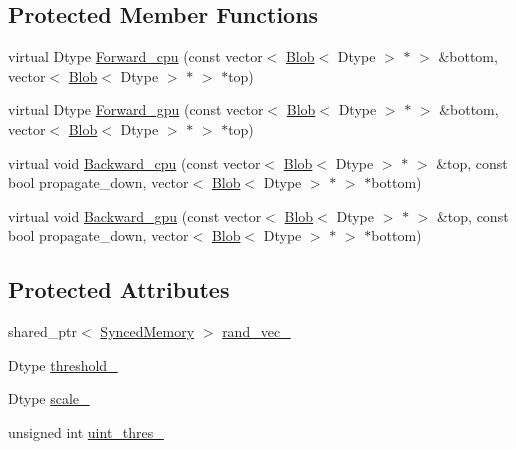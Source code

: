 \subsection*{Protected Member Functions}
\begin{DoxyCompactItemize}
\item 
virtual Dtype \hyperlink{classcaffe_1_1_dropout_layer_a031995973fec83788c03723d9855ec3f}{Forward\+\_\+cpu} (const vector$<$ \hyperlink{classcaffe_1_1_blob}{Blob}$<$ Dtype $>$ $\ast$ $>$ \&bottom, vector$<$ \hyperlink{classcaffe_1_1_blob}{Blob}$<$ Dtype $>$ $\ast$ $>$ $\ast$top)
\item 
virtual Dtype \hyperlink{classcaffe_1_1_dropout_layer_a7f568b33a08534687ee840a89e004a35}{Forward\+\_\+gpu} (const vector$<$ \hyperlink{classcaffe_1_1_blob}{Blob}$<$ Dtype $>$ $\ast$ $>$ \&bottom, vector$<$ \hyperlink{classcaffe_1_1_blob}{Blob}$<$ Dtype $>$ $\ast$ $>$ $\ast$top)
\item 
virtual void \hyperlink{classcaffe_1_1_dropout_layer_aca25a2d883356b1aa5a8c0fe852dc8a1}{Backward\+\_\+cpu} (const vector$<$ \hyperlink{classcaffe_1_1_blob}{Blob}$<$ Dtype $>$ $\ast$ $>$ \&top, const bool propagate\+\_\+down, vector$<$ \hyperlink{classcaffe_1_1_blob}{Blob}$<$ Dtype $>$ $\ast$ $>$ $\ast$bottom)
\item 
virtual void \hyperlink{classcaffe_1_1_dropout_layer_aad9d0019a2760866e47f8dc61b2ff3d9}{Backward\+\_\+gpu} (const vector$<$ \hyperlink{classcaffe_1_1_blob}{Blob}$<$ Dtype $>$ $\ast$ $>$ \&top, const bool propagate\+\_\+down, vector$<$ \hyperlink{classcaffe_1_1_blob}{Blob}$<$ Dtype $>$ $\ast$ $>$ $\ast$bottom)
\end{DoxyCompactItemize}
\subsection*{Protected Attributes}
\begin{DoxyCompactItemize}
\item 
shared\+\_\+ptr$<$ \hyperlink{classcaffe_1_1_synced_memory}{Synced\+Memory} $>$ \hyperlink{classcaffe_1_1_dropout_layer_a3707987fa20305fc798cb5f32a30f669}{rand\+\_\+vec\+\_\+}
\item 
Dtype \hyperlink{classcaffe_1_1_dropout_layer_a8e9d88e6128a97101c27ce8a11158ca6}{threshold\+\_\+}
\item 
Dtype \hyperlink{classcaffe_1_1_dropout_layer_ac8702c053de0fea389f5a0ded8cdc544}{scale\+\_\+}
\item 
unsigned int \hyperlink{classcaffe_1_1_dropout_layer_ae8ba2b98a7bc12643eec8ad72a66be21}{uint\+\_\+thres\+\_\+}
\end{DoxyCompactItemize}



